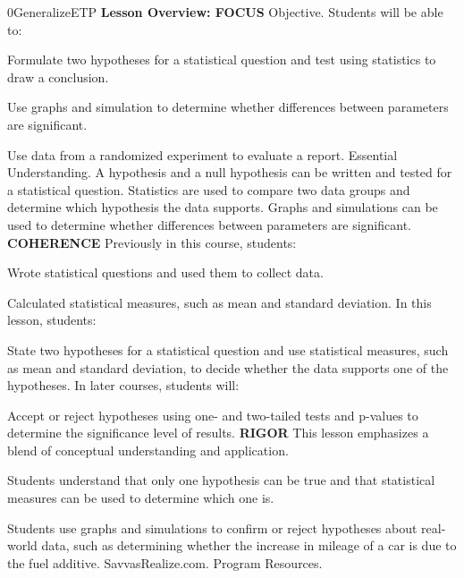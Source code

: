 \documentclass{article}
\newenvironment{te-addendum}[2]{}{}     %
\begin{document}
\begin{te-addendum}{0}{GeneralizeETP}
\textbf{Lesson Overview: FOCUS}
Objective. Students will be able to:
\item Formulate two hypotheses for a statistical question and test using statistics to draw a conclusion.
\item Use graphs and simulation to determine whether differences between parameters are significant.
\item Use data from a randomized experiment to evaluate a report.
Essential Understanding. A hypothesis and a null hypothesis can be written and tested for a statistical question. Statistics are used to compare two data groups and determine which hypothesis the data supports. Graphs and simulations can be used to determine whether differences between parameters are significant.
\textbf{COHERENCE}
Previously in this course, students:
\item Wrote statistical questions and used them to collect data.
\item Calculated statistical measures, such as mean and standard deviation.
In this lesson, students:
\item State two hypotheses for a statistical question and use statistical measures, such as mean and standard deviation, to decide whether the data supports one of the hypotheses.
In later courses, students will:
\item Accept or reject hypotheses using one- and two-tailed tests and p-values to determine the significance level of results.
\textbf{RIGOR}
This lesson emphasizes a blend of conceptual understanding and application.
\item Students understand that only one hypothesis can be true and that statistical measures can be used to determine which one is.
\item Students use graphs and simulations to confirm or reject hypotheses about real-world data, such as determining whether the increase in mileage of a car is due to the fuel additive.
SavvasRealize.com. Program Resources.
\end{te-addendum}
\end{document}
